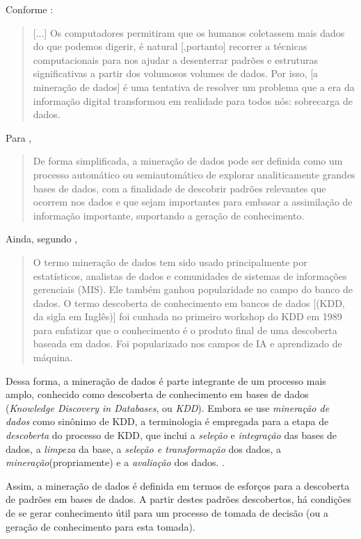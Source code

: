 Conforme \cite{fayyad1996}:
\begin{quotation}
	[...] Os computadores permitiram que os humanos coletassem mais dados do que podemos digerir, é natural [,portanto] recorrer a técnicas computacionais para nos ajudar a desenterrar padrões e estruturas significativas a partir dos volumosos volumes de dados. Por isso, [a mineração de dados] é uma tentativa de resolver um problema que a era da informação digital transformou em realidade para todos nós: sobrecarga de dados.
\end{quotation}

Para \cite{Boscarioli2017},
\begin{quotation}
	De forma simplificada, a mineração de dados pode ser definida como um processo automático ou semiautomático de explorar analiticamente grandes bases de dados, com a finalidade de descobrir padrões relevantes que ocorrem nos dados e que sejam importantes para embasar a assimilação de informação importante, suportando a geração de conhecimento. 
\end{quotation}

Ainda, segundo \cite{fayyad1996}, 
\begin{quotation}
	O termo mineração de dados tem sido usado principalmente por estatísticos, analistas de dados e comunidades de sistemas de informações gerenciais (MIS). Ele também ganhou popularidade no campo do banco de dados. O termo descoberta de conhecimento em bancos de dados [(KDD, da sigla em Inglês)] foi cunhada no primeiro workshop do KDD em 1989 para enfatizar que o conhecimento é o produto final de uma descoberta baseada em dados. Foi popularizado nos campos de IA e aprendizado de máquina.
\end{quotation}

Dessa forma, a mineração de dados é parte integrante de um processo mais amplo, conhecido como descoberta de conhecimento em bases de dados (\textit{Knowledge Discovery in Databases}, ou \textit{KDD})\cite{fayyad1996}. Embora se use \textit{mineração de dados} como sinônimo de KDD, a terminologia é empregada para a etapa de \textit{descoberta}  do processo de KDD, que inclui a \textit{seleção} e \textit{integração} das bases de dados, a \textit{limpeza} da base, a \textit{seleção e transformação} dos dados, a \textit{mineração}(propriamente) e a \textit{avaliação} dos dados. \cite{ferrari2017}\cite{Boscarioli2017}.

Assim, a mineração de dados  é definida em termos de esforços para a descoberta de padrões em bases de dados. A partir destes padrões descobertos, há condições de se gerar conhecimento útil para um processo de tomada de decisão (ou a geração de conhecimento para esta tomada).

